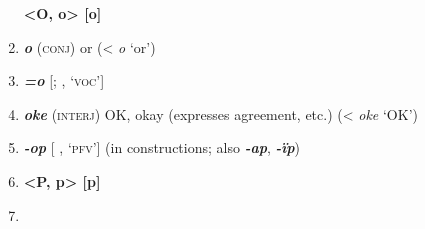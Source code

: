 \begin{enumerate}[noitemsep, label={}, align=left, widest=190, labelsep=1ex,leftmargin=*,itemindent=-10pt]
\noindent \textbf{<O, o>        [o]}\\ \item 

\textbf{\textit{o}} (\textsc{conj}) or (<  \textit{o} ‘or’) \item 
\textbf{\textit{=o}} [;  , ‘\textsc{voc}’] \item 
\textbf{\textit{oke}} (\textsc{interj}) OK, okay (expresses agreement, etc.) (<  \textit{oke} ‘OK’) \item 
\textbf{\textit{-op}} [ , ‘\textsc{pfv}’] (in  constructions; also \textbf{\textit{-ap}}, \textbf{\textit{-ïp}})\\ \item 

\noindent \textbf{<P, p>        [p]}\\ \item 


\end{enumerate}
